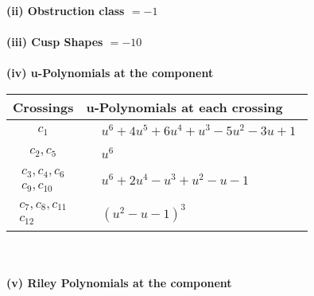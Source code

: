 \documentclass[1p]{elsarticle_modified}
\theoremstyle{definition}
\begin{document}
\flushleft \textbf{(ii) Obstruction class $= -1$}\\~\\
\flushleft \textbf{(iii) Cusp Shapes $= -10$}\\~\\
\newpage\renewcommand{\arraystretch}{1}
\flushleft \textbf{(iv) u-Polynomials at the component}\newline \\
\begin{tabular}{m{50pt}|m{274pt}}
Crossings & \hspace{64pt}u-Polynomials at each crossing \\
\hline $$\begin{aligned}c_{1}\end{aligned}$$&$\begin{aligned}
&u^6+4 u^5+6 u^4+u^3-5 u^2-3 u+1
\end{aligned}$\\
\hline $$\begin{aligned}c_{2},c_{5}\end{aligned}$$&$\begin{aligned}
&u^6
\end{aligned}$\\
\hline $$\begin{aligned}c_{3},c_{4},c_{6}\\c_{9},c_{10}\end{aligned}$$&$\begin{aligned}
&u^6+2 u^4- u^3+u^2- u-1
\end{aligned}$\\
\hline $$\begin{aligned}c_{7},c_{8},c_{11}\\c_{12}\end{aligned}$$&$\begin{aligned}
&(u^2- u-1)^3
\end{aligned}$\\
\hline
\end{tabular}\\~\\
\newpage\renewcommand{\arraystretch}{1}
\flushleft \textbf{(v) Riley Polynomials at the component}\newline \\
\end{document}
